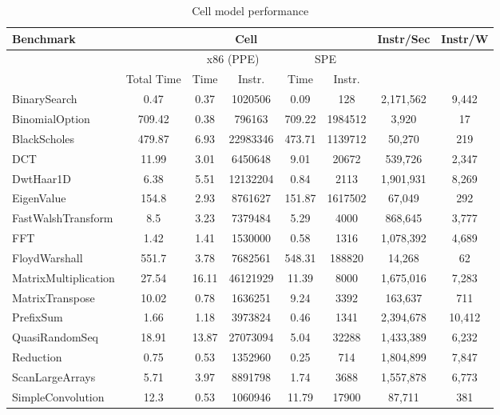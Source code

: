 \documentclass{sig-alternate-05-2015}
\begin{document}
\begin{table}
\centering
\begin{tabular}{| l | c | c | c | c | c | c | c |} \hline
Benchmark & \multicolumn{5}{|c|}{Cell}   &   Instr/Sec & Instr/W \\ \hline
 & & \multicolumn{2}{|c|}{x86 (PPE)} & \multicolumn{2}{|c|}{SPE} \\ \hline
 & Total Time & Time & Instr. & Time & Instr. & & \\ \hline    
BinarySearch & 0.47 & 0.37 & 1020506 & 0.09 & 128 & 2,171,562 & 9,442 \\ \hline
BinomialOption & 709.42 & 0.38 & 796163 & 709.22 & 1984512 & 3,920 & 17 \\ \hline
BlackScholes & 479.87 & 6.93 & 22983346 & 473.71 & 1139712 & 50,270 & 219 \\ \hline
DCT & 11.99 & 3.01 & 6450648 & 9.01 & 20672 & 539,726 & 2,347 \\ \hline
DwtHaar1D & 6.38 & 5.51 & 12132204 & 0.84 & 2113 & 1,901,931 & 8,269 \\ \hline
EigenValue & 154.8 & 2.93 & 8761627 & 151.87 & 1617502 & 67,049 & 292 \\ \hline
FastWalshTransform & 8.5 & 3.23 & 7379484 & 5.29 & 4000 & 868,645 & 3,777 \\ \hline
FFT & 1.42 & 1.41 & 1530000 & 0.58 & 1316 & 1,078,392 & 4,689 \\ \hline
FloydWarshall & 551.7 & 3.78 & 7682561 & 548.31 & 188820 & 14,268 & 62 \\ \hline
MatrixMultiplication & 27.54 & 16.11 & 46121929 & 11.39 & 8000 & 1,675,016 & 7,283 \\ \hline
MatrixTranspose & 10.02 & 0.78 & 1636251 & 9.24 & 3392 & 163,637 & 711 \\ \hline
PrefixSum & 1.66 & 1.18 & 3973824 & 0.46 & 1341 & 2,394,678 & 10,412 \\ \hline
QuasiRandomSeq & 18.91 & 13.87 & 27073094 & 5.04 & 32288 & 1,433,389 & 6,232 \\ \hline
Reduction & 0.75 & 0.53 & 1352960 & 0.25 & 714 & 1,804,899 & 7,847 \\ \hline
ScanLargeArrays & 5.71 & 3.97 & 8891798 & 1.74 & 3688 & 1,557,878 & 6,773 \\ \hline
SimpleConvolution & 12.3 & 0.53 & 1060946 & 11.79 & 17900 & 87,711 & 381 \\ \hline
\end{tabular}
\label{table:cell_performance}
\caption{Cell model performance}
\end{table}
\end{document}
